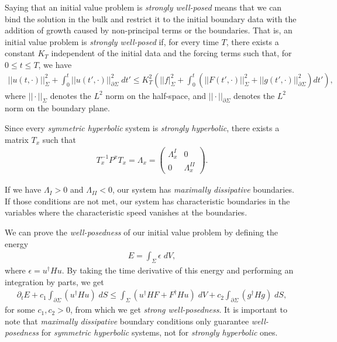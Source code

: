 Saying that an initial value problem is \textit{strongly well-posed} means that we can bind the solution in the bulk and restrict it to the initial boundary data with the addition of growth caused by non-principal terms or the boundaries. That is, an initial value problem is \textit{strongly well-posed} if, for every time $T$, there exists a constant $K_T$ independent of the initial data and the forcing terms such that, for $0 \leq t \leq T$, we have
%
\begin{align}
 ||u(t,\cdot)||^{2}_\Sigma + \int_{0}^{t} ||u(t',\cdot)||^{2}_{\partial \Sigma} \; dt' \leq K_{T}^{2} \left( ||f|^{2}_\Sigma + \int_{0}^{t} \left(||F(t',\cdot)||^{2}_\Sigma + ||g(t',\cdot)||^{2}_{\partial \Sigma} \right) dt' \right),  
\end{align}
%
where $||\cdot||_\Sigma$ denotes the $L^2$ norm on the half-space, and $||\cdot||_{\partial \Sigma}$ denotes the $L^2$ norm on the boundary plane.

Since every \textit{symmetric hyperbolic} system is \textit{strongly hyperbolic}, there exists a matrix $T_x$ such that
%
\begin{align}
 T_x^{-1}P^x T_x = \Lambda_x = \begin{pmatrix}   \Lambda_x^I & 0\\   0 & \Lambda_x^{II}   \end{pmatrix}.
\end{align}

If we have $\Lambda_I > 0$ and $\Lambda_{II} < 0$, our system has \textit{maximally dissipative} boundaries. If those conditions are not met, our system has characteristic boundaries in the variables where the characteristic speed vanishes at the boundaries.

We can prove the \textit{well-posedness} of our initial value problem by defining the energy
%
\begin{align}
 E = \int_\Sigma \epsilon \; dV,  
\end{align}
%
where $\epsilon = u^\dagger H u$. By taking the time derivative of this energy and performing an integration by parts, we get
%
\begin{align}
  \partial_tE + c_1 \int_{\partial\Sigma} \left( u^\dagger H u \right) \; dS \leq \int_\Sigma \left( u^\dagger H F + F^\dagger H u \right) \; dV + c_2 \int_{\partial \Sigma} \left( g^\dagger H g\right) \; dS ,  
\end{align}
%
for some $c_1, c_2 > 0$, from which we get \textit{strong well-posedness}. It is important to note that \textit{maximally dissipative} boundary conditions only guarantee \textit{well-posedness} for \textit{symmetric hyperbolic} systems, not for \textit{strongly hyperbolic} ones.

